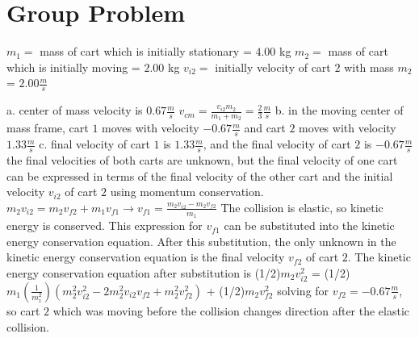 \chapter{Group Problem}
\label{Group Problem}
$m_{1} = $ mass of cart which is initially stationary = $4.00$ kg\newline
$m_{2} = $ mass of cart which is initially moving = $2.00$ kg\newline
$v_{i2} = $ initially velocity of cart $2$ with mass $m_{2}$ = $2.00 \frac{m}{s}$\newline


a. center of mass velocity is $0.67 \frac{m}{s}$\newline
$v_{cm} = \frac{v_{i2}m_{2}}{m_{1} + m_{2}} = \frac{2}{3} \frac{m}{s}$\newline
b. in the moving center of mass frame, cart $1$ moves with velocity $-0.67 \frac{m}{s}$\newline
and cart $2$ moves with velocity $1.33 \frac{m}{s}$\newline
c. final velocity of cart $1$ is $1.33 \frac{m}{s}$, and the final velocity\newline
of cart $2$ is $-0.67 \frac{m}{s}$\newline
the final velocities of both carts are unknown, but the final velocity of one cart\newline
can be expressed in terms of the final velocity of the other cart and the initial\newline
velocity $v_{i2}$ of cart $2$ using momentum conservation.\newline
$m_{2}v_{i2} = m_{2}v_{f2} + m_{1}v_{f1} \rightarrow v_{f1} = \frac{m_{2}v_{i2} - m_{2}v_{f2}}{m_{1}}$\newline
The collision is elastic, so kinetic energy is conserved.  This expression for $v_{f1}$\newline
can be substituted into the kinetic energy conservation equation.  After this substitution,\newline
the only unknown in the kinetic energy conservation equation is the final velocity $v_{f2}$\newline
of cart $2$.  The kinetic energy conservation equation after substitution is\newline
(1/2)$m_{2}v_{i2}^{2}$ = (1/2)$m_{1}(\frac{1}{m_{1}^{2}})(m_{2}^{2}v_{i2}^{2} - 2m_{2}^{2}v_{i2}v_{f2} + m_{2}^{2}v_{f2}^{2})$ + (1/2)$m_{2}v_{f2}^{2}$\newline
solving for $v_{f2} = -0.67 \frac{m}{s}$, so cart $2$ which was moving before the collision\newline
changes direction after the elastic collision.\newline

